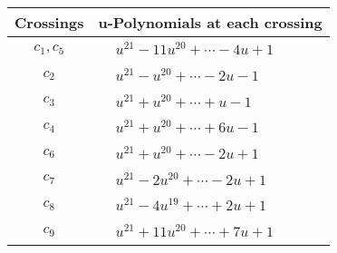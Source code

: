 \documentclass[1p]{elsarticle_modified}
\theoremstyle{definition}
\begin{document}
\begin{tabular}{m{50pt}|m{274pt}}
Crossings & \hspace{64pt}u-Polynomials at each crossing \\
\hline $$\begin{aligned}c_{1},c_{5}\end{aligned}$$&$\begin{aligned}
&u^{21}-11 u^{20}+\cdots-4 u+1
\end{aligned}$\\
\hline $$\begin{aligned}c_{2}\end{aligned}$$&$\begin{aligned}
&u^{21}- u^{20}+\cdots-2 u-1
\end{aligned}$\\
\hline $$\begin{aligned}c_{3}\end{aligned}$$&$\begin{aligned}
&u^{21}+u^{20}+\cdots+u-1
\end{aligned}$\\
\hline $$\begin{aligned}c_{4}\end{aligned}$$&$\begin{aligned}
&u^{21}+u^{20}+\cdots+6 u-1
\end{aligned}$\\
\hline $$\begin{aligned}c_{6}\end{aligned}$$&$\begin{aligned}
&u^{21}+u^{20}+\cdots-2 u+1
\end{aligned}$\\
\hline $$\begin{aligned}c_{7}\end{aligned}$$&$\begin{aligned}
&u^{21}-2 u^{20}+\cdots-2 u+1
\end{aligned}$\\
\hline $$\begin{aligned}c_{8}\end{aligned}$$&$\begin{aligned}
&u^{21}-4 u^{19}+\cdots+2 u+1
\end{aligned}$\\
\hline $$\begin{aligned}c_{9}\end{aligned}$$&$\begin{aligned}
&u^{21}+11 u^{20}+\cdots+7 u+1
\end{aligned}$\\

\end{tabular}
\end{document}
